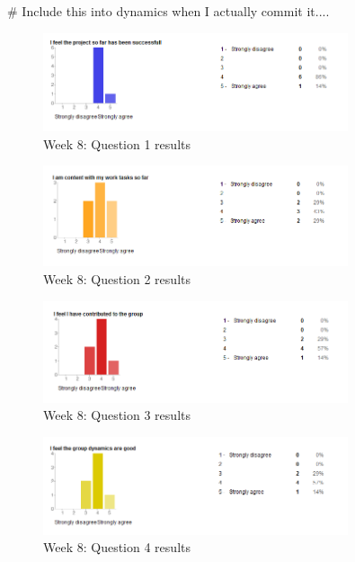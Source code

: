 # Include this into dynamics when I actually commit it....
\begin{figure}[h!]
\caption{Week 8: Question 1 results}
\centering
\includegraphics[width=0.8\textwidth]{evaluation/week_8_images/project_successfull}
\end{figure}

\begin{figure}[h!]
\caption{Week 8: Question 2 results}
\centering
\includegraphics[width=0.8\textwidth]{evaluation/week_8_images/work_tasks}
\end{figure}

\begin{figure}[h!]
\caption{Week 8: Question 3 results}
\centering
\includegraphics[width=0.8\textwidth]{evaluation/week_8_images/contributed_group}
\end{figure}

\begin{figure}[h!]
\caption{Week 8: Question 4 results}
\centering
\includegraphics[width=0.8\textwidth]{evaluation/week_8_images/group_dynamics}
\end{figure}

